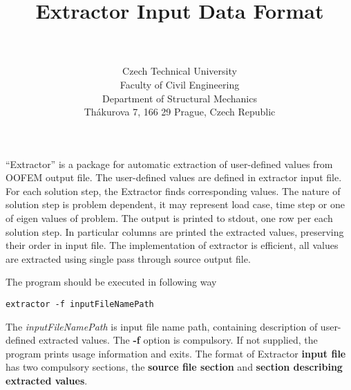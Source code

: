 
\newcommand{\mbf}[1]{\mbox{\boldmath$#1$}}
\newcommand{\excommand}[1]{#1}


\title{\oofem Extractor Input Data Format}
\author{\bp \\ \\
Czech Technical University\\
Faculty of Civil Engineering\\
Department of Structural Mechanics\\
Th\'akurova 7, 166 29 Prague, Czech Republic
}
\maketitle


``Extractor'' is a package for automatic extraction of user-defined
values from OOFEM output file. The user-defined values are defined in
extractor input file. For each solution step, the Extractor finds
corresponding values. The nature of solution step is problem
dependent, it may represent load case, time step or one of eigen
values of problem.
The output is printed to stdout, one row per each solution step.
In particular columns are printed the extracted values, preserving
their order in input file. The implementation of extractor is
efficient, all values are extracted using single pass through source
output file.

The program should be executed in following way
\begin{verbatim}
extractor -f inputFileNamePath
\end{verbatim}
The {\em inputFileNamePath} is input file name path, containing description of
user-defined extracted values. The {\bf-f} option is compulsory. If not
supplied, the program prints usage information and exits. The format
of Extractor {\bf input file} has two compulsory sections, the {\bf source file
section} and {\bf section describing extracted values}.

